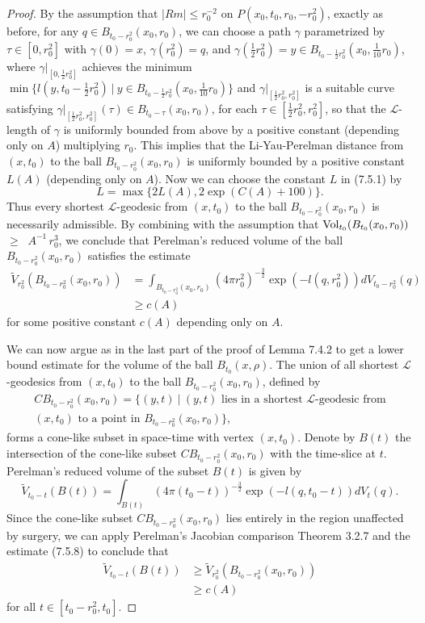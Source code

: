 \begin{proof}
By the assumption that $|Rm|\leq r^{-2}_0$ on
$P(x_0,t_0,r_0,-r^2_0)$, exactly as before, for any $q\in
B_{t_0-r^2_0}(x_0,r_0)$, we can choose a path $\gamma$
parametrized by $\tau\in[0,r^2_0]$ with $\gamma(0)=x$,
$\gamma(r^2_0)=q$, and $\gamma(\frac{1}{2}r^2_0)=y\in
B_{t_0-\frac{1}{2}r^2_0}(x_0,\frac{1}{10}r_0)$, where
$\gamma|_{[0,\frac{1}{2}r^2_0]}$ achieves the minimum
$\min\{l(y,t_0-\frac{1}{2}r^2_0)\ |\ y\in
B_{t_0-\frac{1}{2}r^2_0}(x_0,\frac{1}{10}r_0)\}$ and
$\gamma|_{[\frac{1}{2}r^2_0,r^2_0]}$ is a suitable curve
satisfying $\gamma|_{[\frac{1}{2}r^2_0,r^2_0]}(\tau) \in B_{t_0 -
\tau}(x_0,r_0)$, for each $\tau \in [\frac{1}{2}r^2_0,r^2_0]$, so
that the $\mathcal{L}$-length of $\gamma$ is uniformly bounded
from above by a positive constant (depending only on $A$)
multiplying $r_0$. This implies that the Li-Yau-Perelman distance
from $(x,t_0)$ to the ball $B_{t_0-r^2_0}(x_0,r_0)$ is uniformly
bounded by a positive constant $L(A)$ (depending only on $A$). Now
we can choose the constant $L$ in (7.5.1) by
$$
L=\max\{2L(A),2\exp(C(A)+100)\}.
$$
Thus every shortest $\mathcal{L}$-geodesic from $(x,t_0)$ to the
ball $B_{t_0-r^2_0}(x_0,r_0)$ is necessarily admissible. By
combining with the assumption that $\operatorname{Vol}_{t_0}(B_{t_0}(x_0,r_0))$
$\geq\; \;A^{-1}\,r^3_0$,\; we\; conclude\; that\; Perelman's\;
reduced\; volume\; of\; the\; ball $B_{t_0-r^2_0}(x_0,r_0)$
satisfies the estimate
\begin{align}
\widetilde{V}_{r^2_0}(B_{t_0-r^2_0}(x_0,r_0)) &  =
\int_{B_{t_0-r^2_0}(x_0,r_0)}
(4\pi r^2_0)^{-\frac{3}{2}}\exp(-l(q,r^2_0))dV_{t_0-r^2_0}(q)\\
&  \geq c(A) \nonumber
\end{align}  %
for some positive constant $c(A)$ depending only on $A$.

We can now argue as in the last part of the proof of Lemma 7.4.2
to get a lower bound estimate for the volume of the ball
$B_{t_0}(x,\rho)$. The union of all shortest
$\mathcal{L}$-geodesics from $(x,t_0)$ to the ball
$B_{t_0-r^2_0}(x_0,r_0)$, defined by
\begin{multline*}
CB_{t_0-r^2_0}(x_0,r_0)=\{(y,t)\ |\ (y,t)
\mbox{ lies in a shortest $\mathcal{L}$-geodesic from}\\
(x,t_0)\mbox{ to a point in }B_{t_0-r^2_0}(x_0,r_0)\},
\end{multline*}
forms a cone-like subset in space-time with vertex $(x,t_0)$.
Denote by $B(t)$ the intersection of the cone-like subset
$CB_{t_0-r^2_0}(x_0,r_0)$ with the time-slice at $t$. Perelman's
reduced volume of the subset $B(t)$ is given by
$$
\widetilde{V}_{t_0-t}(B(t))=\int_{B(t)}(4\pi(t_0-t))^{-\frac{3}{2}}
\exp(-l(q,t_0-t))dV_t(q).
$$
Since the cone-like subset $CB_{t_0-r^2_0}(x_0,r_0)$ lies entirely
in the region unaffected by surgery, we can apply Perelman's
Jacobian comparison Theorem 3.2.7 and the estimate (7.5.8) to
conclude that
\begin{align}
\widetilde{V}_{t_0-t}(B(t))&  \geq
\widetilde{V}_{r^2_0}(B_{t_0-r^2_0}(x_0,r_0))\\
&  \geq c(A) \nonumber
\end{align}         %
for all $t\in[t_0-r^2_0,t_0]$.


\end{proof}
